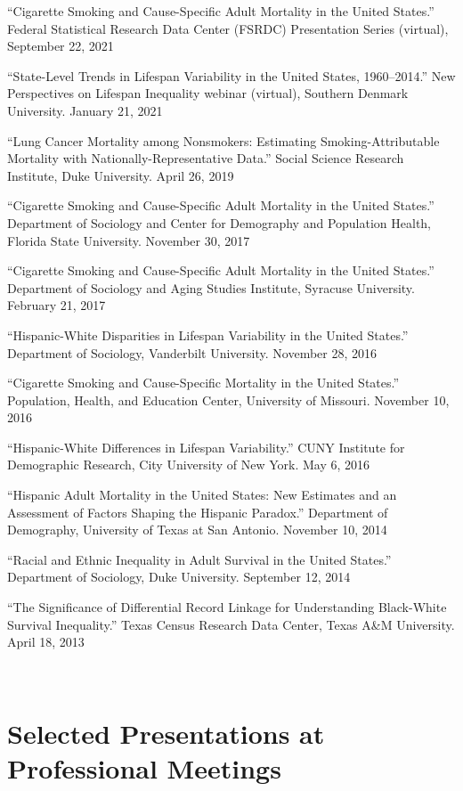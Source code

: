 \documentclass[11pt,]{article}
\begin{document}
``Cigarette Smoking and Cause-Specific Adult Mortality in the United
States.'' Federal Statistical Research Data Center (FSRDC) Presentation
Series (virtual), September 22, 2021

``State-Level Trends in Lifespan Variability in the United States,
1960--2014.'' New Perspectives on Lifespan Inequality webinar (virtual),
Southern Denmark University. January 21, 2021

``Lung Cancer Mortality among Nonsmokers: Estimating
Smoking-Attributable Mortality with Nationally-Representative Data.''
Social Science Research Institute, Duke University. April 26, 2019

``Cigarette Smoking and Cause-Specific Adult Mortality in the United
States.'' Department of Sociology and Center for Demography and
Population Health, Florida State University. November 30, 2017

``Cigarette Smoking and Cause-Specific Adult Mortality in the United
States.'' Department of Sociology and Aging Studies Institute, Syracuse
University. February 21, 2017

``Hispanic-White Disparities in Lifespan Variability in the United
States.'' Department of Sociology, Vanderbilt University. November 28,
2016

``Cigarette Smoking and Cause-Specific Mortality in the United States.''
Population, Health, and Education Center, University of Missouri.
November 10, 2016

``Hispanic-White Differences in Lifespan Variability.'' CUNY Institute
for Demographic Research, City University of New York. May 6, 2016

``Hispanic Adult Mortality in the United States: New Estimates and an
Assessment of Factors Shaping the Hispanic Paradox.'' Department of
Demography, University of Texas at San Antonio. November 10, 2014

``Racial and Ethnic Inequality in Adult Survival in the United States.''
Department of Sociology, Duke University. September 12, 2014

``The Significance of Differential Record Linkage for Understanding
Black-White Survival Inequality.'' Texas Census Research Data Center,
Texas A\&M University. April 18, 2013

~

\section{Selected Presentations at Professional
Meetings}\label{selected-presentations-at-professional-meetings}
\end{document}
